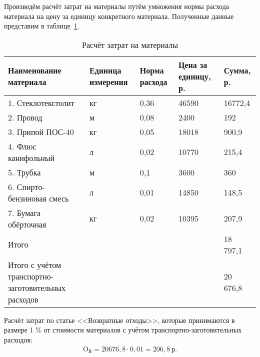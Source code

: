 Произведём расчёт затрат на материалы путём умножения нормы расхода материала
на цену за единицу конкретного материала. Полученные данные представим в
таблице~\ref{tbl:material_costs_result}.

\begin{table}[h!]
  \caption{Расчёт затрат на материалы}
  \label{tbl:material_costs_result}
  \centering
  \small{
    \begin{tabular}{| p{} | p{} |
                      p{} | p{} | p{} |}
      \hline
      Наименование материала & Единица \newline измерения &
      Норма расхода & Цена за \newline единицу, р. & Сумма, р. \\ \hline

      1. Стеклотекстолит          & кг & 0,36  & 46590 & 16772,4  \\ \hline
      2. Провод                   & м  & 0,08  & 2400  & 192      \\ \hline
      3. Припой ПОС-40            & кг & 0,05  & 18018 & 900,9    \\ \hline
      4. Флюс канифольный         & л  & 0,02  & 10770 & 215,4    \\ \hline
      5. Трубка                   & м  & 0,1   & 3600  & 360      \\ \hline
      6. Спирто-бензиновая смесь  & л  & 0,01  & 14850 & 148,5    \\ \hline
      7. Бумага обёрточная        & кг & 0,02  & 10395 & 207,9    \\ \hline
      Итого                       &    &       &       & 18 797,1 \\ \hline
      Итого с учётом \newline
      транспортно-заготовительных расходов & & & & 20 676,8 \\ \hline

    \end{tabular}
  }
\end{table}

Расчёт затрат по статье <<Возвратные отходы>>, которые принимаются в размере
1 \% от стоимости материалов с учётом транспортно-заготовительных расходов:
\begin{align}
  \text{O}_{\text{В}} = 20676{,}8 \cdot 0{,}01 = 206{,}8 \: \text{р.}  \nonumber
\end{align}

\newpage

